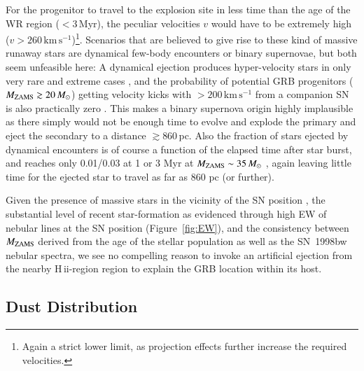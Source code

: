 \documentclass[traditabstract]{aa}
\newcommand{\hii}{\mbox{H\,{\sc ii}}}
\begin{document}
For the progenitor to travel to the explosion site in less time than the age of the WR region ($<3$\,Myr), the peculiar velocities $v$ would have to be extremely high ($v>260\,\mathrm{km\,s^{-1}}$)\footnote{Again a strict lower limit, as projection effects further increase the required velocities.}. Scenarios that are believed to give rise to these kind of massive runaway stars are dynamical few-body encounters or binary supernovae, but both seem unfeasible here: A dynamical ejection produces hyper-velocity stars in only very rare and extreme cases \citep{2001A&A...365...49H, 2012ApJ...751..133P}, and the probability of potential GRB progenitors ($M_{\rm{ZAMS}}\gtrsim 20\,M_\odot$) getting velocity kicks with $>200\,\mathrm{km\,s^{-1}}$ from a companion SN is also practically zero \citep{2011MNRAS.414.3501E}. This makes a binary supernova origin highly implausible as there simply would not be enough time to evolve and explode the primary and eject the secondary to a distance $\gtrsim860$\,pc. Also the fraction of stars ejected by dynamical encounters is of course a function of the elapsed time after star burst, and reaches only 0.01/0.03 at 1 or 3 Myr at $M_{\rm{ZAMS}}\sim 35\,M_\odot$ \citep{2012ApJ...746...15B}, again leaving little time for the ejected star to travel as far as 860 pc (or further).

Given the presence of massive stars in the vicinity of the SN position \citep{2000ApJ...542L..89F}, the substantial level of recent star-formation as evidenced through high EW of nebular lines at the SN position (Figure~\ref{fig:EW}), and the consistency between $M_{\rm{ZAMS}}$ derived from the age of the stellar population as well as the SN~1998bw nebular spectra, we see no compelling reason to invoke an artificial ejection from the nearby \hii-region region to explain the GRB location within its host.

\subsection{Dust Distribution}
\end{document}
